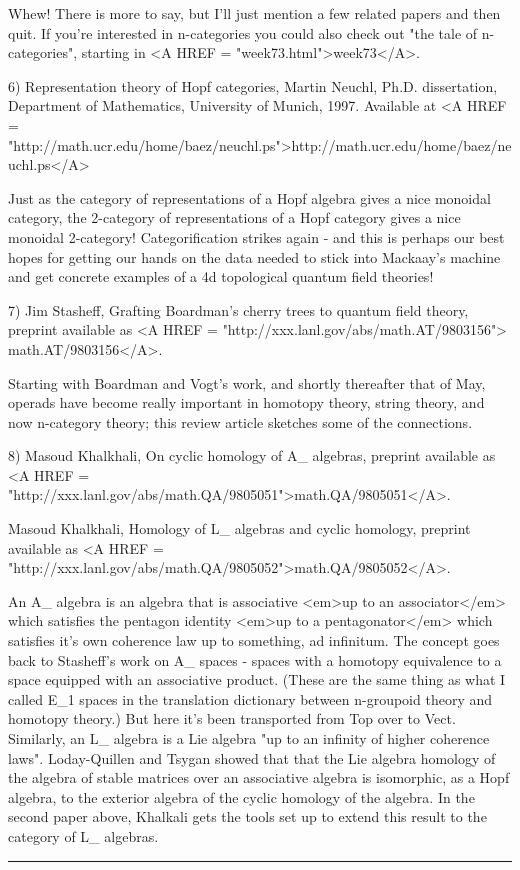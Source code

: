 Whew!  There is more to say, but I'll just mention a few related
papers and then quit.  If you're interested in n-categories you
could also check out "the tale of n-categories", starting in 
<A HREF = "week73.html">week73</A>.

6) Representation theory of Hopf categories, Martin Neuchl, Ph.D.
dissertation, Department of Mathematics, University of Munich,
1997.   Available at <A HREF = "http://math.ucr.edu/home/baez/neuchl.ps">http://math.ucr.edu/home/baez/neuchl.ps</A>

Just as the category of representations of a Hopf algebra gives a nice
monoidal category, the 2-category of representations of a Hopf category
gives a nice monoidal 2-category!  Categorification strikes again - and
this is perhaps our best hopes for getting our hands on the data needed
to stick into Mackaay's machine and get concrete examples of a 4d topological
quantum field theories!

7) Jim Stasheff, Grafting Boardman's cherry trees to quantum field theory,
preprint available as <A HREF = "http://xxx.lanl.gov/abs/math.AT/9803156">
math.AT/9803156</A>.


Starting with Boardman and Vogt's work, and shortly thereafter that of
May, operads have become really important in homotopy theory, string
theory, and now n-category theory; this review article sketches some 
of the connections.

8) Masoud Khalkhali, On cyclic homology of A_{\infty } 
algebras, preprint 
available 
as <A HREF = "http://xxx.lanl.gov/abs/math.QA/9805051">math.QA/9805051</A>.
 
Masoud Khalkhali, Homology of L_{\infty } algebras and cyclic homology,
preprint available 
as <A HREF = "http://xxx.lanl.gov/abs/math.QA/9805052">math.QA/9805052</A>.

An A_{\infty } algebra is an algebra that is associative <em>up to an
associator</em> which satisfies the pentagon identity <em>up to a
pentagonator</em> which satisfies it's own coherence law up to something,
ad infinitum.  The concept goes back to Stasheff's work on A_{\infty }
spaces - spaces with a homotopy equivalence to a space equipped with
an associative product.  (These are the same thing as what I called
E_{1} spaces in the translation dictionary between n-groupoid theory and
homotopy theory.)   But here it's been transported from Top over
to Vect.  Similarly, an L_{\infty } 
algebra is a Lie algebra "up to an infinity
of higher coherence laws".  Loday-Quillen and Tsygan showed that that the
Lie algebra homology of the algebra of stable matrices over an
associative algebra is isomorphic, as a Hopf algebra, to the exterior
algebra of the cyclic homology of the algebra.  In the second paper
above, Khalkali gets the tools set up to extend this result to the
category of L_{\infty } algebras.   







\par\noindent\rule{\textwidth}{0.4pt}
